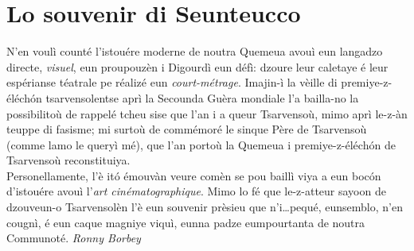 \section*{Lo souvenir di Seunteucco}
\og N'en voulì counté l'istouére moderne de noutra Quemeua avouì eun langadzo directe, \textit{visuel}, eun proupouzèn i Digourdì eun défì: dzoure leur caletaye é leur espérianse téatrale pe réalizé eun \textit{court-métrage}. Imajin-ì la vèille di premiye-z-éléch\'on tsarvensolentse aprì la Secounda Guèra mondiale l'a bailla-no la possibilitoù de rappelé tcheu sise que l'an i a queur Tsarvensoù, mimo aprì le-z-àn teuppe di fasisme; mi surtoù de commémoré le sinque Père de Tsarvensoù (comme lamo le queryì mé), que l'an portoù la Quemeua i premiye-z-éléch\'on de Tsarvensoù reconstituiya.
\\Personellamente, l'è it\'o émouvàn veure comèn se pou baillì viya a eun boc\'on d'istouére avouì l'\textit{art cinématographique}. Mimo lo fé que le-z-atteur sayoon de dzouveun-o Tsarvensolèn l'è eun souvenir prèsieu que n'i\ldots pequé, eunsemblo, n'en cougnì, é eun caque magniye viquì, eunna padze eumpourtanta de noutra Communoté.
\fg{}
\newline
\newline
\hspace*{\fill} \textit{Ronny Borbey}

%
